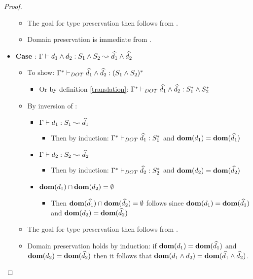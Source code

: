 \begin{proof}
\begin{itemize}
\begin{itemize}
            \item The goal for type preservation then follows from
                .
            \item Domain preservation is immediate from .
        \end{itemize}
        \item \textbf{Case} : $\Gamma \vdash d_1 \wedge d_2: S_1 \wedge S_2 \leadsto \widehat{d_1} \wedge \widehat{d_2}$
        \begin{itemize}
            \item To show: $\Gamma^{*} \vdash_{DOT} \widehat{d_1} \wedge \widehat{d_2}: (S_1 \wedge S_2)^{*}$
            \begin{itemize}
                \item Or by definition \ref{translation}:
                    $\Gamma^{*} \vdash_{DOT} \widehat{d_1} \wedge \widehat{d_2}: S_1^{*} \wedge S_2^{*}$
            \end{itemize}
            \item By inversion of :
            \begin{itemize}
                \item $\Gamma \vdash d_1: S_1 \leadsto \widehat{d_1}$
                \begin{itemize}
                    \item Then by induction:
                        $\Gamma^{*} \vdash_{DOT} \widehat{d_1}: S_1^{*}$ and
                        $\textbf{dom}(d_1) = \textbf{dom}(\widehat{d_1})$
                \end{itemize}
                \item $\Gamma \vdash d_2: S_2 \leadsto \widehat{d_2}$
                \begin{itemize}
                    \item Then by induction:
                        $\Gamma^{*} \vdash_{DOT} \widehat{d_2}: S_2^{*}$ and
                        $\textbf{dom}(d_2) = \textbf{dom}(\widehat{d_2})$
                \end{itemize}
                \item $\textbf{dom}(d_1) \cap \textbf{dom}(d_2) = \emptyset$
                \begin{itemize}
                    \item Then $\textbf{dom}(\widehat{d_1}) \cap \textbf{dom}(\widehat{d_2}) =
                        \emptyset$ follows since $\textbf{dom}(d_1) = \textbf{dom}(\widehat{d_1})$
                        and $\textbf{dom}(d_2) = \textbf{dom}(\widehat{d_2})$
                \end{itemize}
            \end{itemize}
            \item The goal for type preservation then follows from
                .
            \item Domain preservation holds by induction: if $\textbf{dom}(d_1) =
                \textbf{dom}(\widehat{d_1})$ and $\textbf{dom}(d_2) = \textbf{dom}(\widehat{d_2})$ then it
                follows that $\textbf{dom}(d_1 \wedge d_2) =
                \textbf{dom}(\widehat{d_1} \wedge \widehat{d_2})$.
        \end{itemize}
    \end{itemize}
\end{proof}

